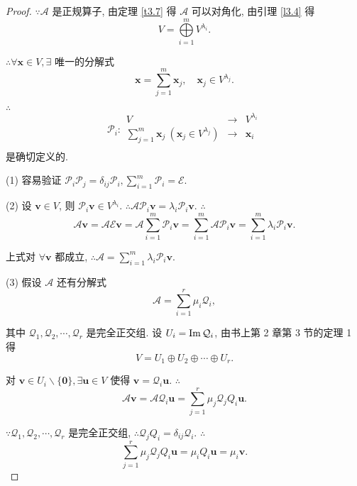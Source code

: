 \documentclass{ctexart}
\begin{document}
\begin{proof}
    $\because\mathcal{A}$ 是正规算子, 由定理 \ref{t3.7} 得 $\mathcal{A}$ 可以对角化, 由引理 \ref{l3.4} 得
    \[V=\bigoplus\limits_{i=1}^mV^{\lambda_i}.\]

    $\therefore\forall\boldsymbol{x}\in V,\exists$ 唯一的分解式
    \[\boldsymbol{x}=\sum\limits_{j=1}^m\boldsymbol{x}_j,\quad\boldsymbol{x}_j\in V^{\lambda_j}.\]

    $\therefore$
    \[\mathcal{P}_i:\begin{array}{rcl}
        V & \to & V^{\lambda_i} \\
        \sum\limits_{j=1}^m\boldsymbol{x}_j\ (\boldsymbol{x}_j\in V^{\lambda_j}) & \to & \boldsymbol{x}_i \\
    \end{array}\]
    是确切定义的.

    (1) 容易验证 $\mathcal{P}_i\mathcal{P}_j=\delta_{ij}\mathcal{P}_i,\sum\limits_{i=1}^m\mathcal{P}_i=\mathcal{E}$.

    (2) 设 $\boldsymbol{v}\in V$, 则 $\mathcal{P}_i\boldsymbol{v}\in V^{\lambda_i}$. $\therefore\mathcal{A}\mathcal{P}_i\boldsymbol{v}=\lambda_i\mathcal{P}_i\boldsymbol{v}$. $\therefore$
    \[\mathcal{A}\boldsymbol{v}=\mathcal{AE}\boldsymbol{v}=\mathcal{A}\sum\limits_{i=1}^m\mathcal{P}_i\boldsymbol{v}=\sum\limits_{i=1}^m\mathcal{A}\mathcal{P}_i\boldsymbol{v}=\sum\limits_{i=1}^m\lambda_i\mathcal{P}_i\boldsymbol{v}.\]

    上式对 $\forall\boldsymbol{v}$ 都成立, $\therefore\mathcal{A}=\sum\limits_{i=1}^m\lambda_i\mathcal{P}_i\boldsymbol{v}$.

    (3) 假设 $\mathcal{A}$ 还有分解式
    \[\mathcal{A}=\sum\limits_{i=1}^r\mu_i\mathcal{Q}_i,\]

    其中 $\mathcal{Q}_1,\mathcal{Q}_2,\cdots,\mathcal{Q}_r$ 是完全正交组. 设 $U_i=\operatorname{Im} \mathcal{Q}_i$, 由书上第 2 章第 3 节的定理 1 得
    \begin{equation}\label{eq3.5}
        V=U_1\oplus U_2\oplus\cdots\oplus U_r.
    \end{equation}

    对 $\boldsymbol{v}\in U_i\backslash\{\boldsymbol{0}\},\exists\boldsymbol{u}\in V$ 使得 $\boldsymbol{v}=\mathcal{Q}_i\boldsymbol{u}$. $\therefore$
    \[\mathcal{A}\boldsymbol{v}=\mathcal{AQ}_i\boldsymbol{u}=\sum\limits_{j=1}^r\mu_j\mathcal{Q}_j{Q}_i\boldsymbol{u}.\]

    $\because\mathcal{Q}_1,\mathcal{Q}_2,\cdots,\mathcal{Q}_r$ 是完全正交组, $\therefore\mathcal{Q}_j{Q}_i=\delta_{ij}\mathcal{Q}_i$. $\therefore$
    \[\sum\limits_{j=1}^r\mu_j\mathcal{Q}_j{Q}_i\boldsymbol{u}=\mu_i{Q}_i\boldsymbol{u}=\mu_i\boldsymbol{v}.\]


\end{proof}
\end{document}
